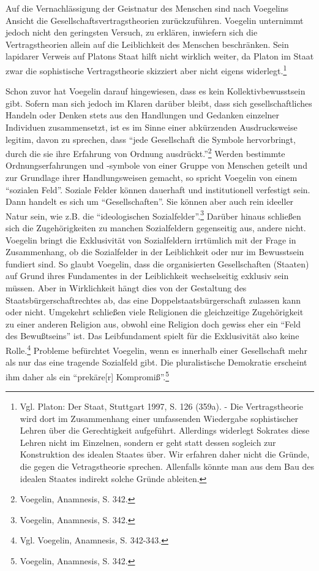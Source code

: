 Auf die Vernachlässigung der Geistnatur des Menschen sind nach Voegelins
Ansicht die Gesellschaftsvertragstheorien zurückzuführen. Voegelin unternimmt
jedoch nicht den geringsten Versuch, zu erklären, inwiefern sich die
Vertragstheorien allein auf die Leiblichkeit des Menschen beschränken. Sein
lapidarer Verweis auf Platons Staat hilft nicht wirklich weiter, da Platon im
Staat zwar die sophistische Vertragstheorie skizziert aber nicht eigens
widerlegt.\footnote{Vgl. Platon: Der Staat, Stuttgart 1997, S. 126 (359a). -
  Die Vertragstheorie wird dort im Zusammenhang einer umfassenden Wiedergabe
  sophistischer Lehren über die Gerechtigkeit aufgeführt. Allerdings widerlegt
  Sokrates diese Lehren nicht im Einzelnen, sondern er geht statt dessen
  sogleich zur Konstruktion des idealen Staates über. Wir erfahren daher nicht
  die Gründe, die gegen die Vetragstheorie sprechen. Allenfalls könnte man aus
  dem Bau des idealen Staates indirekt solche Gründe ableiten.}

Schon zuvor hat Voegelin darauf hingewiesen, dass es kein Kollektivbewusstsein
gibt. Sofern man sich jedoch im Klaren darüber bleibt, dass sich
gesellschaftliches Handeln oder Denken stets aus den Handlungen und Gedanken
einzelner Individuen zusammensetzt, ist es im Sinne einer abkürzenden
Ausdrucksweise legitim, davon zu sprechen, dass "`jede Gesellschaft die Symbole
hervorbringt, durch die sie ihre Erfahrung von Ordnung
ausdrückt."'\footnote{Voegelin, Anamnesis, S. 342.} Werden bestimmte
Ordnungserfahrungen und -symbole von einer Gruppe von Menschen geteilt und zur
Grundlage ihrer Handlungsweisen gemacht, so spricht Voegelin von einem
"`sozialen Feld"'. Soziale Felder können dauerhaft und institutionell
verfestigt sein. Dann handelt es sich um "`Gesellschaften"'. Sie können aber
auch rein ideeller Natur sein, wie z.B. die "`ideologischen
Sozialfelder"'.\footnote{Voegelin, Anamnesis, S. 342.} Darüber hinaus schließen
sich die Zugehörigkeiten zu manchen Sozialfeldern gegenseitig aus, andere
nicht. Voegelin bringt die Exklusivität von Sozialfeldern irrtümlich mit der
Frage in Zusammenhang, ob die Sozialfelder in der Leiblichkeit oder nur im
Bewusstsein fundiert sind. So glaubt Voegelin, dass die organisierten
Gesellschaften (Staaten) auf Grund ihres Fundamentes in der Leiblichkeit
wechselseitig exklusiv sein müssen. Aber in Wirklichkeit hängt dies von der
Gestaltung des Staatsbürgerschaftrechtes ab, das eine Doppelstaatsbürgerschaft
zulassen kann oder nicht. Umgekehrt schließen viele Religionen die
gleichzeitige Zugehörigkeit zu einer anderen Religion aus, obwohl eine
Religion doch gewiss eher ein "`Feld des Bewußtseins"' ist. Das Leibfundament
spielt für die Exklusivität also keine Rolle.\footnote{Vgl. Voegelin,
  Anamnesis, S. 342-343.}  Probleme befürchtet Voegelin, wenn es innerhalb
einer Gesellschaft mehr als nur das eine tragende Sozialfeld gibt. Die
pluralistische Demokratie erscheint ihm daher als ein "`prekäre[r]
Kompromiß"'.\footnote{Voegelin, Anamnesis, S. 342.}

